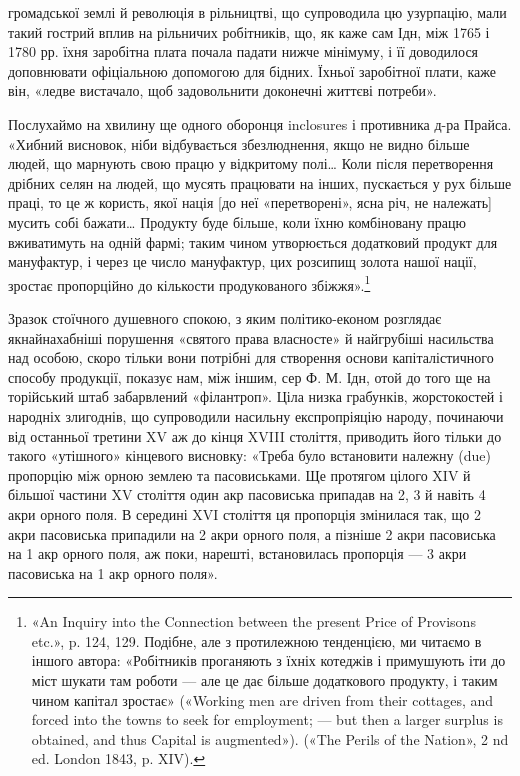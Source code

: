 громадської землі й революція в рільництві, що супроводила
цю узурпацію, мали такий гострий вплив на рільничих робітників,
що, як каже сам Ідн, між 1765 і 1780 рр. їхня заробітна
плата почала падати нижче мінімуму, і її доводилося доповнювати
офіціальною допомогою для бідних. Їхньої заробітної плати,
каже він, «ледве вистачало, щоб задовольнити доконечні життєві
потреби».

Послухаймо на хвилину ще одного оборонця inclosures і противника
д-ра Прайса. «Хибний висновок, ніби відбувається
збезлюднення, якщо не видно більше людей, що марнують свою
працю у відкритому полі\dots{} Коли після перетворення дрібних
селян на людей, що мусять працювати на інших, пускається у
рух більше праці, то це ж користь, якої нація [до неї «перетворені»,
ясна річ, не належать] мусить собі бажати\dots{} Продукту
буде більше, коли їхню комбіновану працю вживатимуть на
одній фармі; таким чином утворюється додатковий продукт для
мануфактур, і через це число мануфактур, цих розсипищ золота
нашої нації, зростає пропорційно до кількости продукованого
збіжжя».\footnote{
«An Inquiry into the Connection between the present Price of
Provisons etc.», p. 124, 129. Подібне, але з протилежною тенденцією, ми
читаємо в іншого автора: «Робітників проганяють з їхніх котеджів і
примушують іти до міст шукати там роботи — але це дає більше додаткового
продукту, і таким чином капітал зростає» («Working men are driven
from their cottages, and forced into the towns to seek for employment; —
but then a larger surplus is obtained, and thus Capital is augmented»).
(«The Perils of the Nation», 2 nd ed. London 1843, p. XIV).
}

Зразок стоїчного душевного спокою, з яким політико-економ
розглядає якнайнахабніші порушення «святого права власносте»
й найгрубіші насильства над особою, скоро тільки вони
потрібні для створення основи капіталістичного способу продукції,
показує нам, між іншим, сер Ф. М. Ідн, отой до того
ще на торійський штаб забарвлений «філантроп». Ціла низка грабунків,
жорстокостей і народніх злигоднів, що супроводили насильну
експропріяцію народу, починаючи від останньої третини
XV аж до кінця XVIII століття, приводить його тільки до
такого «утішного» кінцевого висновку: «Треба було встановити
належну (due) пропорцію між орною землею та пасовиськами.
Ще протягом цілого XIV й більшої частини XV століття
один акр пасовиська припадав на 2, 3 й навіть 4 акри орного
поля. В середині XVI століття ця пропорція змінилася так, що
2 акри пасовиська припадили на 2 акри орного поля, а пізніше
2 акри пасовиська на 1 акр орного поля, аж поки, нарешті, встановилась
пропорція — 3 акри пасовиська на 1 акр орного поля».

